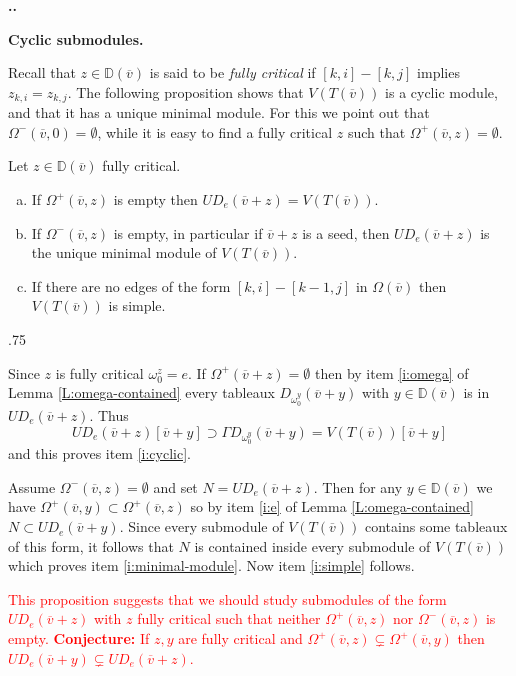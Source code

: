 \documentclass[11pt,fleqn]{amsart}
\makeatletter
\renewcommand\thesection{\arabic{section}}
\renewcommand\proofname{Proof}
\renewenvironment{proof}[1][\textit{\proofname}]{\par
 \pushQED{\qed}%
 \normalfont \topsep.75\paraskip\relax
 \trivlist
 \item[\hskip\labelsep
 \itshape
 #1\@addpunct{.}]\ignorespaces
}{%
 \popQED\endtrivlist\@endpefalse
}
\newcounter{para}[section]
\renewcommand\thepara{\thesection.\arabic{para}}
\def\paragraph{%
 \noindent
 \refstepcounter{para}%
 \textbf{\thepara.}\hspace{1ex}%
}
\newcommand\about[1]{%
 {\bfseries#1.}%
}
\newcommand\vv{\overline{v}}
\newcommand\DD{\mathbb D}
\makeatother
\begin{document}
\paragraph
\about{Cyclic submodules}
Recall that $z \in \DD(\vv)$ is said to be \emph{fully critical} if $[k,i] - 
[k,j]$ implies $z_{k,i} = z_{k,j}$. The following proposition shows that 
$V(T(\vv))$ is a cyclic module, and that it has a unique minimal module. For 
this we point out that $\Omega^-(\vv,0) = \emptyset$, while it is easy to find
a fully critical $z$ such that $\Omega^+(\vv,z) = \emptyset$.
\begin{Proposition}
Let $z \in \DD(\vv)$ fully critical.
\begin{enumerate}[(a)]
\item 
\label{i:cyclic}
If $\Omega^+(\vv, z)$ is empty then $U D_e(\vv + z) = V(T(\vv))$.

\item
\label{i:minimal-module}
If $\Omega^-(\vv,z)$ is empty, in particular if $\vv + z$ is a seed, then 
$U D_e(\vv + z)$ is the unique minimal module of $V(T(\vv))$.

\item
\label{i:simple}
If there are no edges of the form $[k,i] - [k-1,j]$ in $\Omega(\vv)$ then
$V(T(\vv))$ is simple.
\end{enumerate}
\end{Proposition}
\begin{proof}
Since $z$ is fully critical $\omega_0^z = e$. If $\Omega^+(\vv + z) = 
\emptyset$ then by item \ref{i:omega} of Lemma \ref{L:omega-contained} every
tableaux $D_{\omega_0^y}(\vv + y)$ with $y \in \DD(\vv)$ is in $U D_e(\vv+z)$.
Thus 
\[
U D_e(\vv+z)[\vv + y] 
	\supset \Gamma D_{\omega_0^y}(\vv+y) 
	= V(T(\vv))[\vv+y]
\]
and this proves item \ref{i:cyclic}.

Assume $\Omega^-(\vv,z) = \emptyset$ and set $N = U D_e(\vv + z)$. Then 
for any $y \in \DD(\vv)$ we have $\Omega^+(\vv,y) \subset \Omega^+(\vv,z)$ so
by item \ref{i:e} of Lemma \ref{L:omega-contained} $N \subset U D_e(\vv + y)$.
Since every submodule of $V(T(\vv))$ contains some tableaux of this form, it
follows that $N$ is contained inside every submodule of $V(T(\vv))$ which 
proves item \ref{i:minimal-module}. Now item \ref{i:simple} follows.
\end{proof}

\textcolor{red}{This proposition suggests that we should study submodules of 
the form $U D_e(\vv+z)$ with $z$ fully critical such that neither 
$\Omega^+(\vv,z)$ nor $\Omega^-(\vv,z)$ is empty. \textbf{Conjecture:} If $z,y$
are fully critical and $\Omega^+(\vv,z) \subsetneq \Omega^+(\vv,y)$ then 
$UD_e(\vv + y) \subsetneq UD_e(\vv + z)$.}
\end{document}
